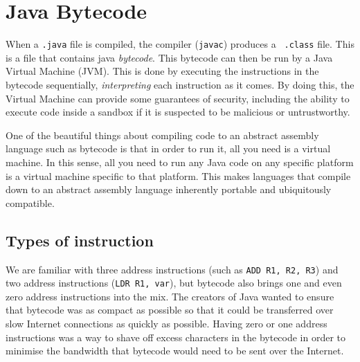 \section{Java Bytecode}

When a {\tt .java} file is compiled, the compiler ({\tt javac}) produces a {\tt
.class} file. This is a file that contains java {\it bytecode}. This bytecode
can then be run by a Java Virtual Machine (JVM). This is done by executing the
instructions in the bytecode sequentially, {\it interpreting} each instruction
as it comes. By doing this, the Virtual Machine can provide some guarantees of
security, including the ability to execute code inside a sandbox if it is
suspected to be malicious or untrustworthy.


One of the beautiful things about compiling code to an abstract assembly
language such as bytecode is that in order to run it, all you need is a virtual
machine. In this sense, all you need to run any Java code on any specific
platform is a virtual machine specific to that platform. This makes languages
that compile down to an abstract assembly language inherently portable and
ubiquitously compatible.

\subsection{Types of instruction}

We are familiar with three address instructions (such as {\tt ADD R1, R2, R3})
and two address instructions ({\tt LDR R1, var}), but bytecode also brings one
and even zero address instructions into the mix. The creators of Java wanted to
ensure that bytecode was as compact as possible so that it could be transferred
over slow Internet connections as quickly as possible. Having zero or one
address instructions was a way to shave off excess characters in the bytecode in
order to minimise the bandwidth that bytecode would need to be sent over the
Internet.


